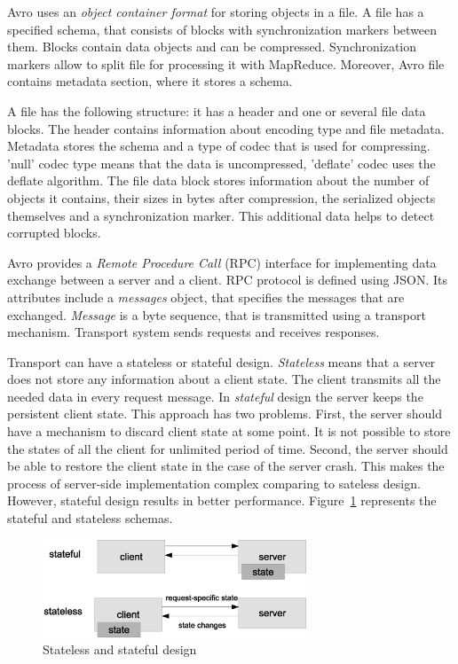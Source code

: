 Avro uses an \textit{object container format} for storing objects in a file.
A file has a specified schema, that consists of blocks with synchronization markers between them.
Blocks contain data objects and can be compressed.
Synchronization markers allow to split file for processing it with MapReduce.
Moreover, Avro file contains metadata section, where it stores a schema.

A file has the following structure: it has a header and one or several file data blocks.
The header contains information about encoding type and file metadata.
Metadata stores the schema and a type of codec that is used for compressing.
'null' codec type means that the data is uncompressed, 'deflate' codec uses the deflate algorithm.
The file data block stores information about the number of objects it contains, their sizes in bytes after compression, the serialized objects themselves and a synchronization marker.
This additional data helps to detect corrupted blocks.

Avro provides a \textit{Remote Procedure Call} (RPC) interface for implementing data exchange between a server and a client.
RPC protocol is defined using JSON.
Its attributes include a \textit{messages} object, that specifies the messages that are exchanged.  
\textit{Message} is a byte sequence, that is transmitted using a transport mechanism.
Transport system sends requests and receives responses.

Transport can have a stateless or stateful design.
\textit{Stateless} means that a server does not store any information about a client state.
The client transmits all the needed data in every request message.
In \textit{stateful} design the server keeps the persistent client state.
This approach has two problems.
First, the server should have a mechanism to discard client state at some point.
It is not possible to store the states of all the client for unlimited period of time.
Second, the server should be able to restore the client state in the case of the server crash.
This makes the process of server-side implementation complex comparing to sateless design.
However, stateful design results in better performance.
Figure~\ref{fig:stateful_stateless} represents the stateful and stateless schemas.

\begin{figure}
  \centering
  \includegraphics [width=0.7\textwidth]{images/stateful_stateless}
  \caption{Stateless and stateful design}
  \label{fig:stateful_stateless}
\end{figure}

